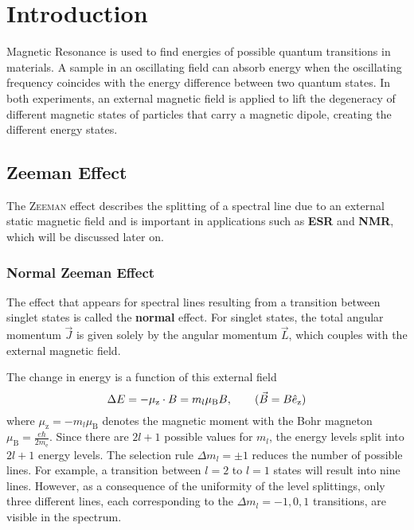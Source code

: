 \chapter{Introduction}
Magnetic Resonance is used to find energies of possible quantum transitions in materials.
A sample in an oscillating field can absorb energy when the oscillating frequency coincides with the energy difference between two quantum states. %
In both experiments, an external magnetic field is applied to lift the degeneracy of different magnetic states of particles that carry a magnetic dipole, creating the different energy states.

\section{Zeeman Effect}\label{sec:zeeman}
The \textsc{Zeeman} effect describes the splitting of a spectral line due to an external static magnetic field \cite{schwabl} and is important in applications such as \textbf{ESR} and \textbf{NMR}, which will be discussed later on.

\subsection{Normal Zeeman Effect}
The effect that appears for spectral lines resulting from a transition between singlet states is called the \textbf{normal} effect.
For singlet states, the total angular momentum $\vec{J}$ is given solely by the angular momentum $\vec{L}$, which couples with the external magnetic field.

The change in energy is a function of this external field
\begin{equation*}
	\Delta E = -\mu_\text{z}\cdot B=m_l\mu_\text{B}B, \tag{$\vec{B}=B\hat{e}_\text{z}$}
\end{equation*}
where $\mu_\text{z}=-m_l\mu_\text{B}$ denotes the magnetic moment with the Bohr magneton $\mu_\text{B}=\frac{e\hbar}{2m_\text{e}}$.
Since there are $2l+1$ possible values for $m_l$, the energy levels split into $2l+1$ energy levels.
The selection rule $\Delta m_l=\pm 1$ reduces the number of possible lines.
For example, a transition between $l=2$ to $l=1$ states will result into nine lines.
However, as a consequence of the uniformity of the level splittings, only three different lines, each corresponding to the $\Delta m_l=-1,0,1$ transitions, are visible in the spectrum.

